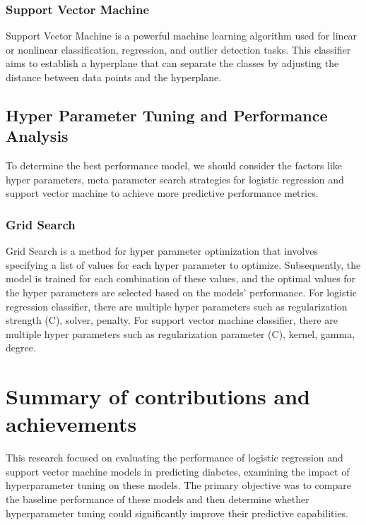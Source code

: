 \subsubsection{Support Vector Machine}
Support Vector Machine is a powerful machine learning algorithm used for linear or nonlinear classification, regression, and outlier detection tasks. This classifier aims to establish a hyperplane that can separate the classes by adjusting the distance between data points and the hyperplane. 


\subsection{Hyper Parameter Tuning and Performance Analysis}
\label{sec:intro_some_sub4}
To determine the best performance model, we should consider the factors like hyper parameters, meta parameter search strategies for logistic regression and support vector machine to achieve more predictive performance metrics.
\subsubsection{Grid Search}
Grid Search is a method for hyper parameter optimization that involves specifying a list of values for each hyper parameter to optimize. Subsequently, the model is trained for each combination of these values, and the optimal values for the hyper parameters are selected based on the models' performance.
For logistic regression classifier, there are multiple hyper parameters such as regularization strength (C), solver, penalty. For support vector machine classifier, there are multiple hyper parameters such as regularization parameter (C), kernel, gamma, degree.

\section{Summary of contributions and achievements} %
\label{sec:intro_sum_results} %
This research focused on evaluating the performance of logistic regression and support vector machine models in predicting diabetes, examining the impact of hyperparameter tuning on these models. The primary objective was to compare the baseline performance of these models and then determine whether hyperparameter tuning could significantly improve their predictive capabilities.

